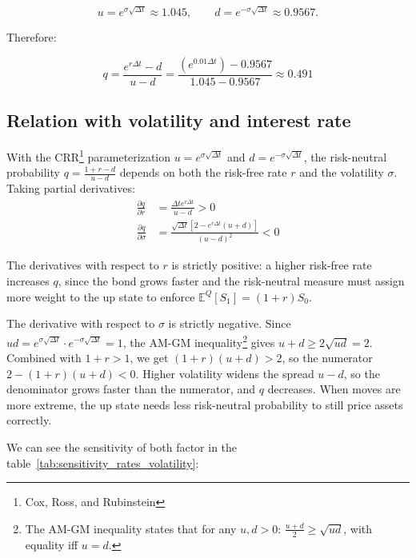 \documentclass[hidelinks, 12pt, a4paper]{article}
\theoremstyle{definition}
\begin{document}
\begin{equation}
  u = e^{\sigma \sqrt{\Delta t}} \approx 1.045,
  \qquad
  d = e^{-\sigma \sqrt{\Delta t}} \approx 0.9567.
  \label{eq:up-and-down}
\end{equation}

\noindent Therefore:

\begin{equation}
\boxed{q=\frac{e^{r\Delta t}-d}{u-d} 
= \frac{(e^{0.01 \Delta t}) - 0.9567}{1.045 - 0.9567}
\approx 0.491}
\end{equation}

\newpage

\subsection{Relation with volatility and interest rate}

\noindent With the CRR\footnote{Cox, Ross, and Rubinstein} parameterization $u = e^{\sigma\sqrt{\Delta t}}$ and $d = e^{-\sigma\sqrt{\Delta t}}$, the
risk-neutral probability $q = \frac{1+r-d}{u-d}$ depends on both the risk-free rate $r$ and the
volatility $\sigma$. Taking partial derivatives:
\begin{align}
  \frac{\partial q}{\partial r}
  &= \frac{\Delta t e^{r\Delta t}}{u-d} > 0 \\[6pt]
  \frac{\partial q}{\partial \sigma}
  &= \frac{\sqrt{\Delta t}\left[2 - e^{r\Delta t}(u+d)\right]}{(u-d)^2} < 0
\end{align}

The derivatives with respect to $r$ is strictly positive: a higher risk-free rate increases $q$, since the
bond grows faster and the risk-neutral measure must assign more weight to the up state to
enforce $\mathbb{E}^Q[S_1] = (1+r)S_0$.

The derivative with respect to $\sigma$ is strictly negative. Since $ud = e^{\sigma\sqrt{\Delta t}} \cdot
e^{-\sigma\sqrt{\Delta t}} = 1$, the AM-GM inequality\footnote{The AM-GM inequality states
that for any $u, d > 0$: $\frac{u+d}{2} \geq \sqrt{ud}$, with equality iff $u = d$.} gives
$u + d \geq 2\sqrt{ud} = 2$. Combined with $1+r > 1$, we get $(1+r)(u+d) > 2$, so the
numerator $2 - (1+r)(u+d) < 0$. Higher volatility widens the spread $u - d$, so the
denominator grows faster than the numerator, and $q$ decreases. When moves are
more extreme, the up state needs less risk-neutral probability to still price assets correctly.

\noindent We can see the sensitivity of both factor in the table~\ref{tab:sensitivity_rates_volatility}:
\end{document}
